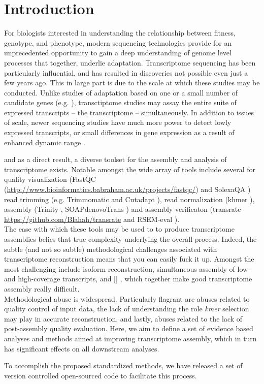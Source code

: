 \section*{Introduction}


For biologists interested in understanding the relationship between fitness, genotype, and phenotype, modern sequencing technologies provide for an unprecedented opportunity to gain a deep understanding of genome level processes that together, underlie adaptation. Transcriptome sequencing has been particularly influential, and has resulted in discoveries not possible even just a few years ago. This in large part is due to the scale at which these studies may be conducted. Unlike studies of adaptation based on one or a small number of candidate genes (e.g. \citep{Fitzpatrick:2005vd,Panhuis:2006kp}), transctiptome studies may assay the entire suite of expressed transcripts -- the transcriptome -- simultaneously. In addition to issues of scale, newer sequencing studies have much more power to detect lowly expressed transcripts, or small differences in gene expression as a result of enhanced dynamic range \citep{Wolf:2013hd,Vijay:2012gy}.

and as a direct result, a diverse toolset for the assembly and analysis of transcriptome exists. Notable amongst the wide array of tools include several for quality visualization (FastQC (\url{http://www.bioinformatics.babraham.ac.uk/projects/fastqc/}) and SolexaQA \citep{Cox:2010ch}) read trimming (e.g. Trimmomatic \citep{Bolger:2014ek} and Cutadapt \citep{Martin:2011va}), read normalization (khmer \citep{Pell:2012id}), assembly (Trinity \citep{Haas:2013jq}, SOAPdenovoTrans \citep{Xie:2013wu}) and assembly verificaton (transrate \url{https://github.com/Blahah/transrate} and RSEM-eval \citep{Li:2014er}).  \\


The ease with which these tools may be used to to produce transcriptome assemblies belies that true complexity underlying the overall process. Indeed, the subtle (and not so subtle) methodological challenges associated with transcriptome reconstruction means that you can easily fuck it up. Amongst the most challenging include isoform reconstruction, simultaneous assembly of low- and high-coverage transcripts, and [] \citep{Modrek:2001ud,Johnson:2003kh}, which together make good transcriptome assembly really difficult. \\


Methodological abuse is widespread. Particularly flagrant are abuses related to quality control of input data, the lack of understanding the role \textit{kmer} selection may play in accurate reconstruction, and lastly, abuses related to the lack of post-assembly quality evaluation. Here, we aim to define a set of evidence based analyses and methods aimed at improving transcriptome assembly, which in turn has significant effects on all downstream analyses. 


To accomplish the proposed standardized methods, we have released a set of version controlled open-sourced code to facilitate this process.   
